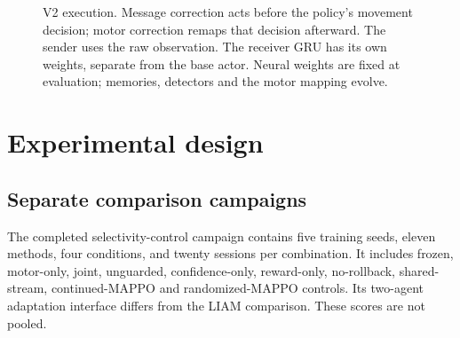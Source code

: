 \documentclass[10pt,a4paper]{article}
\begin{document}
\begin{figure}[ht]
\centering
{}
\caption{V2 execution. Message correction acts before the policy's movement decision; motor correction remaps that decision afterward. The sender uses the raw observation. The receiver GRU has its own weights, separate from the base actor. Neural weights are fixed at evaluation; memories, detectors and the motor mapping evolve.}
\end{figure}

\section{Experimental design}
\subsection{Separate comparison campaigns}
The completed selectivity-control campaign contains five training seeds, eleven methods, four conditions, and twenty sessions per combination. It includes frozen, motor-only, joint, unguarded, confidence-only, reward-only, no-rollback, shared-stream, continued-MAPPO and randomized-MAPPO controls. Its two-agent adaptation interface differs from the LIAM comparison. These scores are not pooled.
\end{document}
